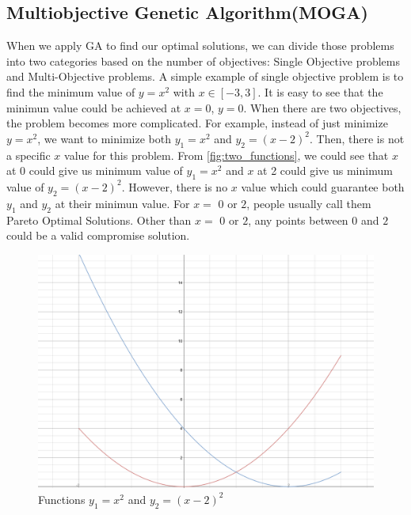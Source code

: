 \subsection{Multiobjective Genetic Algorithm(MOGA)}
When we apply GA to find our optimal solutions, we can divide those problems into two categories based on the number of objectives: Single Objective problems and Multi-Objective problems. A simple example of single objective problem is to find the minimum value of \(y=x^2\) with \(x\in [-3,3]\). It is easy to see that the minimun value could be achieved at \(x=0\), \(y=0\). When there are two objectives, the problem becomes more complicated. For example, instead of just minimize \(y=x^2\), we want to minimize both \(y_{1}=x^2\) and \(y_{2}=(x-2)^2\). Then, there is not a specific \(x\) value for this problem. From \autoref{fig:two_functions}, we could see that \(x\) at 0 could give us minimum value of \(y_{1}=x^2\) and \(x\) at 2 could give us minimum value of \(y_{2}=(x-2)^2\). However, there is no \(x\) value which could guarantee both \(y_{1}\) and \(y_{2}\) at their minimun value. For \(x=\) \(0\) or \(2\), people usually call them Pareto Optimal Solutions\cite{Hans_1988_Multicriteria_Pareto_Optimal}\cite{Vira_1983_Multiobjective_Pareto_Optimal}. Other than \(x=\) \(0\) or \(2\), any points between \(0\) and \(2\) could be a valid compromise solution. 

\begin{figure}[htp] 
\centering
\includegraphics[scale=.2]{images/Figure_1.png}
\caption{Functions \(y_{1}=x^2\) and \(y_{2}=(x-2)^2\)}
\label{fig:two_functions}
\end{figure}

